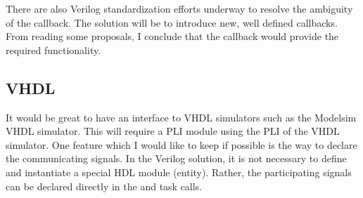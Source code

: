 There are also Verilog standardization efforts underway to resolve the
ambiguity of the  callback. The solution will be
to introduce new, well defined callbacks. From reading some proposals,
I conclude that the  callback would provide the
required functionality.

\subsection{VHDL}

It would be great to have an interface to VHDL simulators such as the
Modelsim VHDL simulator. This will require a PLI module using the
PLI of the VHDL simulator. One feature which I would
like to keep if possible is the way to declare the communicating
signals.  In the Verilog solution, it is not necessary to define and
instantiate a special HDL module (entity). Rather, the participating
signals can be declared directly in the  and
 task calls.
